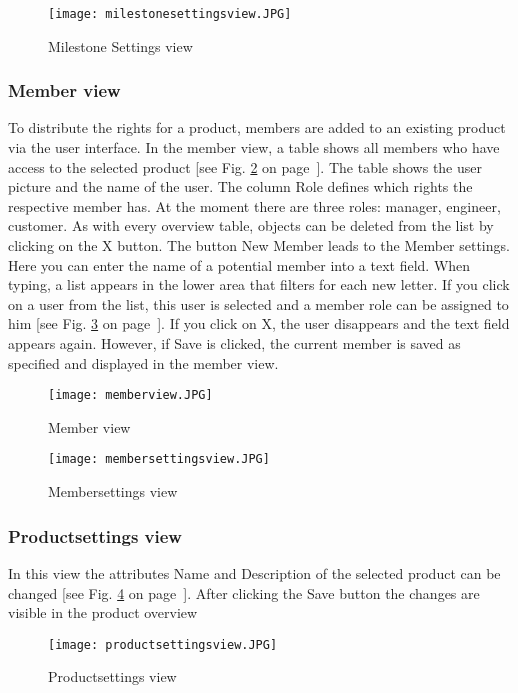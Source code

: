     \begin{figure}[h]
        \centering
        \texttt{[image: milestonesettingsview.JPG]}
        \caption{Milestone Settings view}
        \label{fig: milestonesettingsview}
    \end{figure}

    \subsubsection*{Member view}
    To distribute the rights for a product, members are added to an existing product via the user interface. In the member view, a table shows all members who have access to the selected product [see Fig. \ref{fig: memberview} on page~\pageref{fig: memberview}]. The table shows the user picture and the name of the user. The column Role defines which rights the respective member has. At the moment there are three roles: manager, engineer, customer. As with every overview table, objects can be deleted from the list by clicking on the X button. The button New Member leads to the Member settings. Here you can enter the name of a potential member into a text field. When typing, a list appears in the lower area that filters for each new letter. If you click on a user from the list, this user is selected and a member role can be assigned to him [see Fig. \ref{fig: membersettingsview} on page~\pageref{fig: membersettingsview}]. If you click on X, the user disappears and the text field appears again. However, if Save is clicked, the current member is saved as specified and displayed in the member view.
    
    \begin{figure}[h]
        \centering
        \texttt{[image: memberview.JPG]}
        \caption{Member view}
        \label{fig: memberview}
    \end{figure}

    \begin{figure}[h]
        \centering
        \texttt{[image: membersettingsview.JPG]}
        \caption{Membersettings view}
        \label{fig: membersettingsview}
    \end{figure}

    \subsubsection*{Productsettings view}
    In this view the attributes Name and Description of the selected product can be changed [see Fig. \ref{fig: productsettingsview} on page~\pageref{fig: productsettingsview}]. After clicking the Save button the changes are visible in the product overview
    \begin{figure}[h]
        \centering
        \texttt{[image: productsettingsview.JPG]}
        \caption{Productsettings view}
        \label{fig: productsettingsview}
    \end{figure}